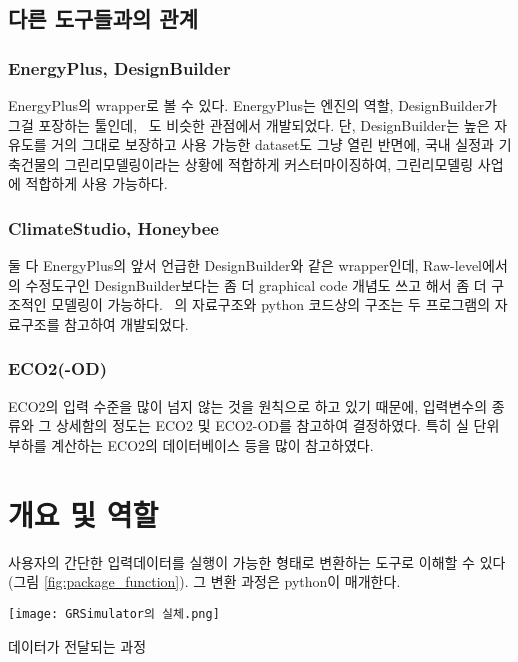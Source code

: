 \subsection{다른 도구들과의 관계}
\subsubsection{EnergyPlus, DesignBuilder}
\simulator\는 EnergyPlus의 wrapper로 볼 수 있다. EnergyPlus는 엔진의 역할, DesignBuilder가 그걸 포장하는 툴인데, \simulator~도 비슷한 관점에서 개발되었다. 단, DesignBuilder는 높은 자유도를 거의 그대로 보장하고 사용 가능한 dataset도 그냥 열린 반면에, \simulator\는 국내 실정과 기축건물의 그린리모델링이라는 상황에 적합하게 커스터마이징하여, 그린리모델링 사업에 적합하게 사용 가능하다.

\subsubsection{ClimateStudio, Honeybee}
둘 다 EnergyPlus의 앞서 언급한 DesignBuilder와 같은 wrapper인데, Raw-level에서의 수정도구인 DesignBuilder보다는 좀 더 graphical code 개념도 쓰고 해서 좀 더 구조적인 모델링이 가능하다. \simulator~의 자료구조와 python 코드상의 구조는 두 프로그램의 자료구조를 참고하여 개발되었다.

\subsubsection{ECO2(-OD)}
\simulator\는 ECO2의 입력 수준을 많이 넘지 않는 것을 원칙으로 하고 있기 때문에, 입력변수의 종류와 그 상세함의 정도는 ECO2 및 ECO2-OD를 참고하여 결정하였다. 특히 실 단위 부하를 계산하는 ECO2의 데이터베이스 등을 많이 참고하였다.


\section{ 개요 및 역할}

\simulator\는 사용자의 간단한 입력데이터를 \ep 실행이 가능한 형태로 변환하는 도구로 이해할 수 있다 (그림 \ref{fig:package_function}). 그 변환 과정은 python이 매개한다.

\begin{defaultfigure}
  \texttt{[image: GRSimulator의 실체.png]}
  \caption{\simulator{} 데이터가 전달되는 과정}
  \label{fig:package_function}
\end{defaultfigure}
